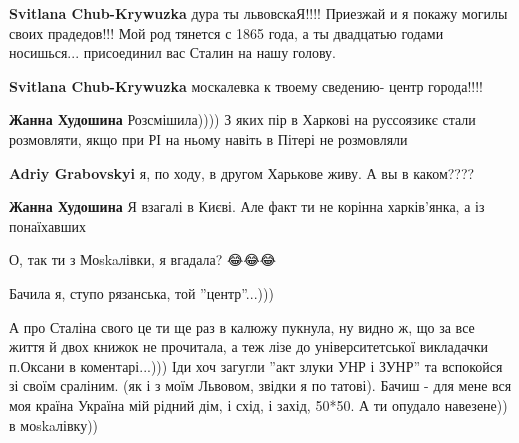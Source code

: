 \begin{itemize}
\begin{itemize}
\textbf{Svitlana Chub-Krywuzka} дура ты львовскаЯ!!!! Приезжай и я покажу
могилы своих прадедов!!! Мой род тянется с 1865 года, а ты двадцатью годами
носишься... присоединил вас Сталин на нашу голову.

 
\textbf{Svitlana Chub-Krywuzka} москалевка к твоему сведению- центр города!!!!

 
\textbf{Жанна Худошина} Розсмішила)))) З яких пір в Харкові на руссоязикє стали розмовляти, якщо при РІ на ньому навіть в Пітері не розмовляли

 
\textbf{Adriy Grabovskyi} я, по ходу, в другом Харькове живу. А вы в каком????

 
\textbf{Жанна Худошина} Я взагалі в Києві. Але факт ти не корінна харків’янка, а із понаїхавших

 

О, так ти з Моskaлівки, я вгадала? 😂😂😂

Бачила я, ступо рязанська, той ''центр''...)))

А про Сталіна свого це ти ще раз в калюжу пукнула, ну видно ж, що за все життя
й двох книжок не прочитала, а теж лізе до університетської викладачки п.Оксани
в коментарі...))) Іди хоч загугли ''акт злуки УНР і ЗУНР'' та вспокойся зі
своїм сраліним. (як і з моїм Львовом, звідки я по татові). Бачиш - для мене вся
моя країна Україна мій рідний дім, і схід, і захід, 50*50. А ти опудало
навезене)) в моskaлівку))


\end{itemize}
\end{itemize}
